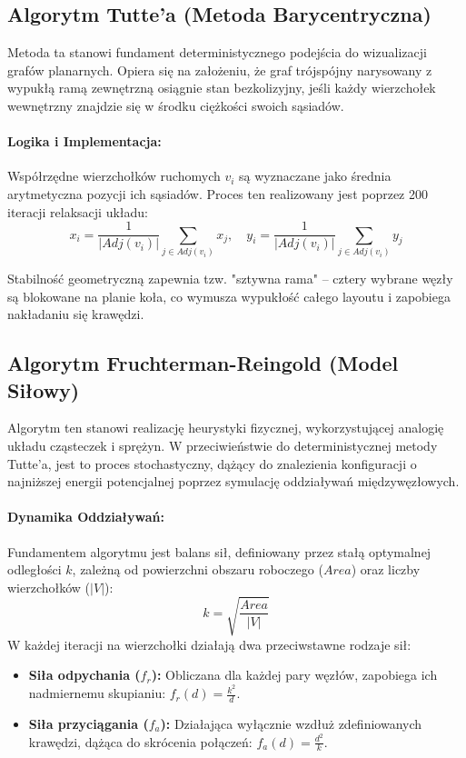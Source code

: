 \documentclass[12pt,a4paper]{article}
\begin{document}
\subsection{Algorytm Tutte'a (Metoda Barycentryczna)}
Metoda ta stanowi fundament deterministycznego podejścia do wizualizacji grafów planarnych. Opiera się na założeniu, że graf trójspójny narysowany z wypukłą ramą zewnętrzną osiągnie stan bezkolizyjny, jeśli każdy wierzchołek wewnętrzny znajdzie się w środku ciężkości swoich sąsiadów.

\paragraph{Logika i Implementacja:} 
Współrzędne wierzchołków ruchomych $v_i$ są wyznaczane jako średnia arytmetyczna pozycji ich sąsiadów. Proces ten realizowany jest poprzez 200 iteracji relaksacji układu:
\[ x_i = \frac{1}{|Adj(v_i)|} \sum_{j \in Adj(v_i)} x_j, \quad y_i = \frac{1}{|Adj(v_i)|} \sum_{j \in Adj(v_i)} y_j \]

Stabilność geometryczną zapewnia tzw. "sztywna rama" – cztery wybrane węzły są blokowane na planie koła, co wymusza wypukłość całego layoutu i zapobiega nakładaniu się krawędzi.


\subsection{Algorytm Fruchterman-Reingold (Model Siłowy)}
Algorytm ten stanowi realizację heurystyki fizycznej, wykorzystującej analogię układu cząsteczek i sprężyn. W przeciwieństwie do deterministycznej metody Tutte'a, jest to proces stochastyczny, dążący do znalezienia konfiguracji o najniższej energii potencjalnej poprzez symulację oddziaływań międzywęzłowych.



\paragraph{Dynamika Oddziaływań:}
Fundamentem algorytmu jest balans sił, definiowany przez stałą optymalnej odległości $k$, zależną od powierzchni obszaru roboczego ($Area$) oraz liczby wierzchołków ($|V|$):
\[ k = \sqrt{\frac{Area}{|V|}} \]
W każdej iteracji na wierzchołki działają dwa przeciwstawne rodzaje sił:
\begin{itemize}
    \item \textbf{Siła odpychania ($f_r$):} Obliczana dla każdej pary węzłów, zapobiega ich nadmiernemu skupianiu: $f_r(d) = \frac{k^2}{d}$.
    \item \textbf{Siła przyciągania ($f_a$):} Działająca wyłącznie wzdłuż zdefiniowanych krawędzi, dążąca do skrócenia połączeń: $f_a(d) = \frac{d^2}{k}$.
\end{itemize}
\end{document}
